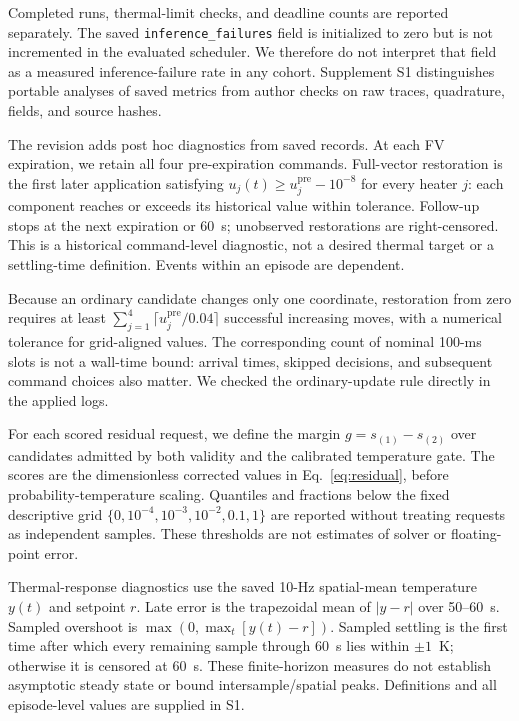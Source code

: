 Completed runs, thermal-limit checks, and deadline counts are reported separately. The saved \texttt{inference\_failures} field is initialized to zero but is not incremented in the evaluated scheduler. We therefore do not interpret that field as a measured inference-failure rate in any cohort. Supplement S1 distinguishes portable analyses of saved metrics from author checks on raw traces, quadrature, fields, and source hashes.



\label{sec:saved_analyses}

The revision adds post hoc diagnostics from saved records. At each FV expiration, we retain all four pre-expiration commands. Full-vector restoration is the first later application satisfying $u_j(t)\geq u_j^{\mathrm{pre}}-10^{-8}$ for every heater $j$: each component reaches or exceeds its historical value within tolerance. Follow-up stops at the next expiration or 60~s; unobserved restorations are right-censored. This is a historical command-level diagnostic, not a desired thermal target or a settling-time definition. Events within an episode are dependent.

Because an ordinary candidate changes only one coordinate, restoration from zero requires at least $\sum_{j=1}^{4}\lceil u_j^{\mathrm{pre}}/0.04\rceil$ successful increasing moves, with a numerical tolerance for grid-aligned values. The corresponding count of nominal 100-ms slots is not a wall-time bound: arrival times, skipped decisions, and subsequent command choices also matter. We checked the ordinary-update rule directly in the applied logs.

For each scored residual request, we define the margin $g=s_{(1)}-s_{(2)}$ over candidates admitted by both validity and the calibrated temperature gate. The scores are the dimensionless corrected values in Eq.~\eqref{eq:residual}, before probability-temperature scaling. Quantiles and fractions below the fixed descriptive grid $\{0,10^{-4},10^{-3},10^{-2},0.1,1\}$ are reported without treating requests as independent samples. These thresholds are not estimates of solver or floating-point error.

Thermal-response diagnostics use the saved 10-Hz spatial-mean temperature $y(t)$ and setpoint $r$. Late error is the trapezoidal mean of $|y-r|$ over 50--60~s. Sampled overshoot is $\max(0,\max_t[y(t)-r])$. Sampled settling is the first time after which every remaining sample through 60~s lies within $\pm1$~K; otherwise it is censored at 60~s. These finite-horizon measures do not establish asymptotic steady state or bound intersample/spatial peaks. Definitions and all episode-level values are supplied in S1.



